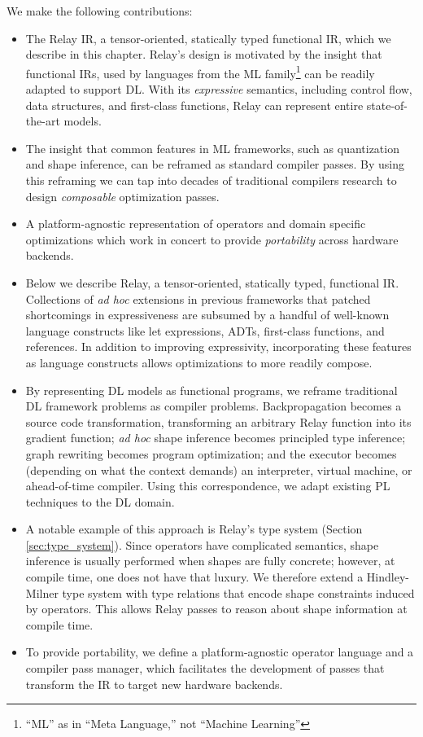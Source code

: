 We make the following contributions:
\begin{itemize}
  \item The Relay IR, a tensor-oriented, statically typed
    functional IR,
    which we describe in this chapter.
  Relay's design is motivated by the insight that functional IRs, used by
  languages from the ML family\footnote{``ML'' as in ``Meta Language,'' not
  ``Machine Learning''} can be readily adapted to support DL.
  With its \textit{expressive} semantics,
    including control flow, data structures, and first-class functions,
    Relay can represent entire state-of-the-art models.
  \item The insight that common features in ML frameworks,
    such as quantization and shape inference,
    can be reframed as standard compiler passes.
  By using this reframing we can tap into
    decades of traditional compilers research to design
    \textit{composable} optimization passes.
  \item
    A platform-agnostic representation of operators and domain specific
      optimizations which work in concert to provide \textit{portability}
      across hardware backends.
  \item
  Below we describe Relay, a tensor-oriented, statically typed,
    functional IR.
  Collections of \textit{ad hoc} extensions in previous frameworks
    that patched shortcomings in expressiveness are subsumed by a handful of well-known language
    constructs like let expressions, ADTs, first-class functions, and references.
  In addition to improving expressivity,
    incorporating these features as language constructs
    allows optimizations to more readily compose.
  \item
  By representing DL models as functional programs, we reframe traditional
    DL framework problems as compiler problems.
  Backpropagation becomes a source code transformation,
    transforming an arbitrary Relay function into its gradient function;
    \textit{ad hoc} shape inference becomes principled type inference;
    graph rewriting becomes program optimization;
    and the executor becomes (depending on what the context demands) an
    interpreter, virtual machine, or ahead-of-time compiler.
  Using this correspondence, we adapt existing
    PL techniques to the DL domain.
  \item
    A notable example of this approach is Relay's type system (Section \ref{sec:type_system}).
    Since operators have complicated semantics, shape inference is usually
      performed when shapes are fully concrete;
      however, at compile time, one does not have that luxury.
    We therefore extend a Hindley-Milner type system with type relations that encode shape
      constraints induced by operators.
    This allows Relay passes to reason about shape information at compile time.
  \item To provide portability,
    we define a platform-agnostic operator language
    and a compiler pass manager, which facilitates the development of
    passes that transform the IR to target new hardware backends.
\end{itemize}

